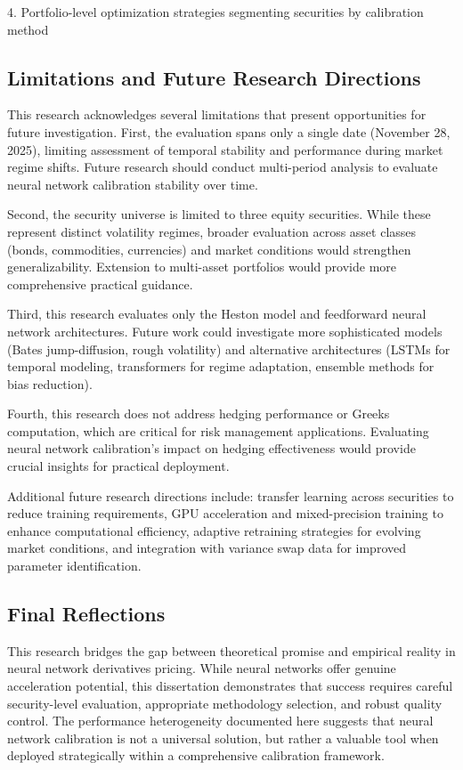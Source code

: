 \documentclass[12pt,a4paper]{article}
\begin{document}
4. Portfolio-level optimization strategies segmenting securities by calibration method

\subsection{Limitations and Future Research Directions}

This research acknowledges several limitations that present opportunities for future investigation. First, the evaluation spans only a single date (November 28, 2025), limiting assessment of temporal stability and performance during market regime shifts. Future research should conduct multi-period analysis to evaluate neural network calibration stability over time.

Second, the security universe is limited to three equity securities. While these represent distinct volatility regimes, broader evaluation across asset classes (bonds, commodities, currencies) and market conditions would strengthen generalizability. Extension to multi-asset portfolios would provide more comprehensive practical guidance.

Third, this research evaluates only the Heston model and feedforward neural network architectures. Future work could investigate more sophisticated models (Bates jump-diffusion, rough volatility) and alternative architectures (LSTMs for temporal modeling, transformers for regime adaptation, ensemble methods for bias reduction).

Fourth, this research does not address hedging performance or Greeks computation, which are critical for risk management applications. Evaluating neural network calibration's impact on hedging effectiveness would provide crucial insights for practical deployment.

Additional future research directions include: transfer learning across securities to reduce training requirements, GPU acceleration and mixed-precision training to enhance computational efficiency, adaptive retraining strategies for evolving market conditions, and integration with variance swap data for improved parameter identification.

\subsection{Final Reflections}

This research bridges the gap between theoretical promise and empirical reality in neural network derivatives pricing. While neural networks offer genuine acceleration potential, this dissertation demonstrates that success requires careful security-level evaluation, appropriate methodology selection, and robust quality control. The performance heterogeneity documented here suggests that neural network calibration is not a universal solution, but rather a valuable tool when deployed strategically within a comprehensive calibration framework.
\end{document}
